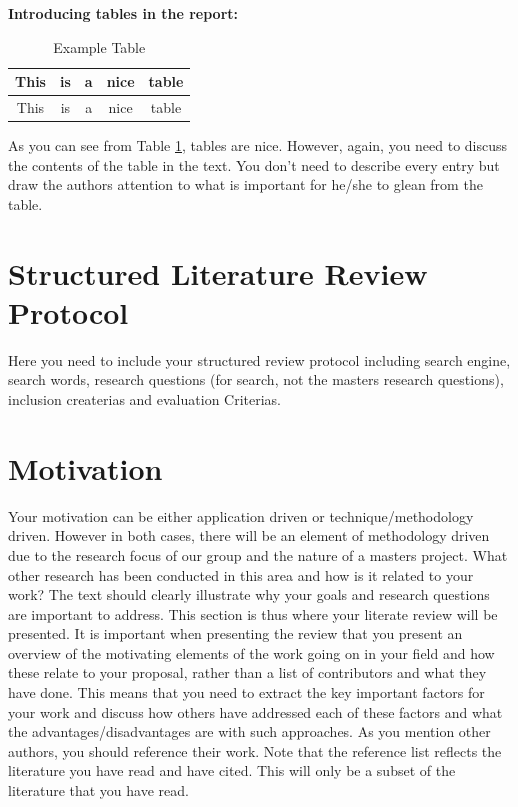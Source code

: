 \vspace{0.5cm}

\noindent
{\bf Introducing tables in the report: }\\

\begin{table}[htbp]
\begin{center}
\begin{tabular}{|c|c|c|c|c|}\hline\hline
This & is & a & nice & table\\\hline
This & is & a & nice & table\\\hline\hline
\end{tabular}
\caption{Example Table}
\end{center}
\label{tab:ExampleTable}
\end{table}%

As you can see from Table \ref{tab:ExampleTable}, tables are nice. However, again, you need to discuss the contents of the table in the text. You don't need to describe every entry but draw the authors attention to what is important for he/she to glean from the table. 

\section{Structured Literature Review Protocol}

Here you need to include your structured review protocol including search engine, search words, research questions  (for search, not the masters research questions), inclusion createrias and evaluation Criterias. 

\section{Motivation}
\label{sec:no2}

Your motivation can be either application driven or technique/methodology driven. However in both cases, there will be an element of methodology driven due to the research focus of our group and the nature of a masters project.  
What other research has been conducted in this area and how is it related to your work? The text should clearly illustrate why your goals and research questions are important to address. This section is thus where your literate review will be presented. It is important when presenting the review that you present an overview of the motivating elements of the work going on in your field and how these relate to your proposal, rather than a list of contributors and what they have done. This means that you need to extract the key important factors for your work and discuss how others have addressed each of these factors and what the advantages/disadvantages are with such approaches. As you mention other authors, you should reference their work. Note that the reference list reflects the literature you have read and have cited. This will only be a subset of the literature that you have read.
